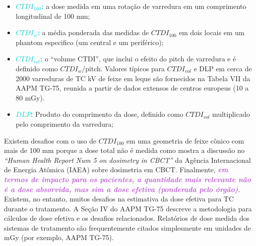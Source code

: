 \documentclass[11pt,a4paper]{article}
\newcounter{exemplo}
\begin{document}
    \begin{itemize}[label=\textcolor{CarnationPink}{$\blacksquare$}]
        \item \textcolor{DarkTurquoise}{\textbf{$CTDI_{100}$:}} a dose medida em uma rotação de varredura em um comprimento longitudinal de 100 mm;
        \item \textcolor{DarkTurquoise}{\textbf{$CTDI_{w}$:}} a média ponderada das medidas de $CTDI_{100}$ em dois locais em um phantom especifico (um central e um periférico);
        \item \textcolor{DarkTurquoise}{\textbf{$CTDI_{vol}$:}} o “volume CTDI”, que inclui o efeito do pitch de varredura e é definido como $CTDI_{w}$/pitch. Valores típicos para $CTDI_{vol}$ e DLP em cerca de 2000 varreduras de TC kV de feixe em leque  são fornecidos na Tabela VII da AAPM TG-75, reunida a partir de dados extensos de centros europeus (10 a 80 mGy).
        \item \textcolor{DarkTurquoise}{\textbf{$DLP$:}} Produto do comprimento da dose, definido como $CTDI_{vol}$ multiplicado pelo comprimento da varredura;
    \end{itemize}

    Existem desafios com o uso de $CTDI_{100}$ em uma geometria de feixe cônico com mais de 100 mm porque a dose total não é medida como mostra a discussão no  \textit{``Human Health Report Num 5 on dosimetry in CBCT''} da Agência Internacional de Energia Atômica (IAEA) sobre dosimetria em CBCT. Finalmente, \textcolor{MediumOrchid}{\textbf{\textit{em termos de impacto para os pacientes, a quantidade mais relevante não é a dose absorvida, mas sim a dose efetiva (ponderada pelo órgão)}}}. Existem, no entanto, muitos desafios na estimativa da dose efetiva para TC durante o tratamento. A Seção IV do AAPM TG-75 descreve a metodologia para cálculos de dose efetiva e os desafios relacionados. Relatórios de dose medida dos sistemas de tratamento são frequentemente citados simplesmente em unidades de mGy (por exemplo, AAPM TG-75).
\end{document}
